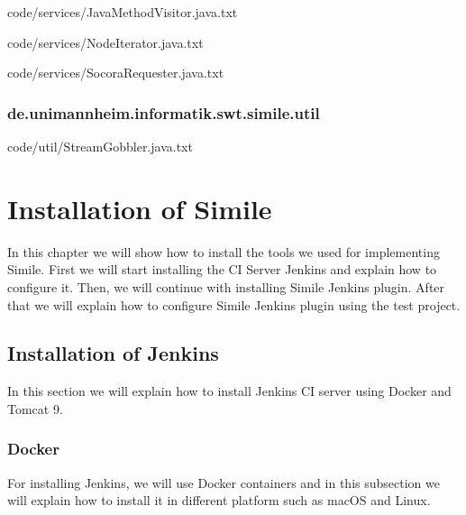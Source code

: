 
{code/services/JavaMethodVisitor.java.txt}


{code/services/NodeIterator.java.txt}


{code/services/SocoraRequester.java.txt}
\subsection{de.unimannheim.informatik.swt.simile.util}

{code/util/StreamGobbler.java.txt}

\chapter{Installation of Simile}
In this chapter we will show how to install the tools we used for implementing Simile. First we will start installing the CI Server Jenkins and explain how to configure it. Then, we will continue with installing Simile Jenkins plugin. After that we will explain how to configure Simile Jenkins plugin using the test project.

\section{Installation of Jenkins}
In this section we will explain how to install Jenkins CI server using Docker and Tomcat 9.

\subsection{Docker}
For installing Jenkins, we will use Docker containers and in this subsection we will explain how to install it in different platform such as macOS and Linux.

